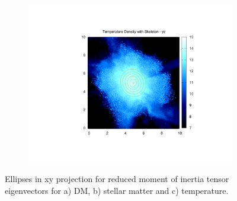 \documentclass[journal]{IEEEtran}
\begin{document}
\begin{figure}[!t]
\begin{subfigure}[t]{0.3\textwidth}
		\includegraphics[width=\linewidth]{TempDenEllipyz}
	\end{subfigure}
\label{fig:ellipses}
\caption{Ellipses in xy projection for reduced moment of inertia tensor eigenvectors for a) DM, b) stellar matter and c) temperature.}
\end{figure}
\end{document}
